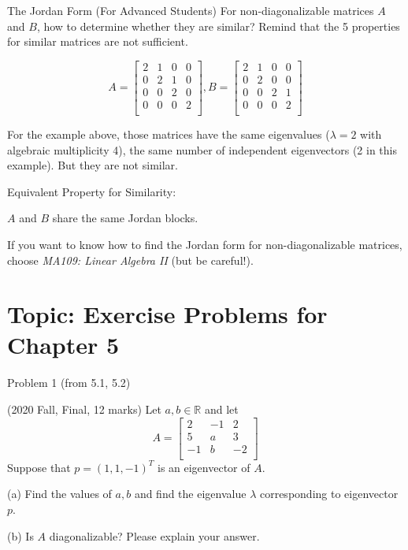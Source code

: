 \documentclass{beamer}
\begin{document}
\begin{frame}{The Jordan Form (For Advanced Students)}
For non-diagonalizable matrices $A$ and $B$, how to determine whether they are similar? Remind that the 5 properties for similar matrices are not sufficient.

\begin{equation*}
    A=\left[ \begin{matrix}
        2&		1&		0&		0\\
        0&		2&		1&		0\\
        0&		0&		2&		0\\
        0&		0&		0&		2\\
    \end{matrix} \right] , B=\left[ \begin{matrix}
        2&		1&		0&		0\\
        0&		2&		0&		0\\
        0&		0&		2&		1\\
        0&		0&		0&		2\\
    \end{matrix} \right]
\end{equation*}

For the example above, those matrices have the same eigenvalues ($\lambda =2$ with algebraic multiplicity 4), the same number of independent eigenvectors (2 in this example). But they are not similar.

\vspace{3pt}
Equivalent Property for Similarity:
\begin{center}
    $A$ and $B$ share the same Jordan blocks.
\end{center}

If you want to know how to find the Jordan form for non-diagonalizable matrices, choose \emph{MA109: Linear Algebra II} (but be careful!).
\end{frame}

\section{Topic: Exercise Problems for Chapter 5}
\begin{frame}{Problem 1 (from 5.1, 5.2)}
\begin{example}
    (2020 Fall, Final, 12 marks) Let $a, b \in \mathbb{R}$ and let
    \begin{equation*}
        A=\left[ \begin{matrix}
            2&		-1&		2\\
            5&		a&		3\\
            -1&		b&		-2\\
        \end{matrix} \right]
    \end{equation*}
    Suppose that $p=(1,1,-1)^T$ is an eigenvector of $A$.

    (a) Find the values of $a,b$ and find the eigenvalue $\lambda$ corresponding to eigenvector $p$.

    (b) Is $A$ diagonalizable? Please explain your answer.
\end{example}
\end{frame}
\end{document}
